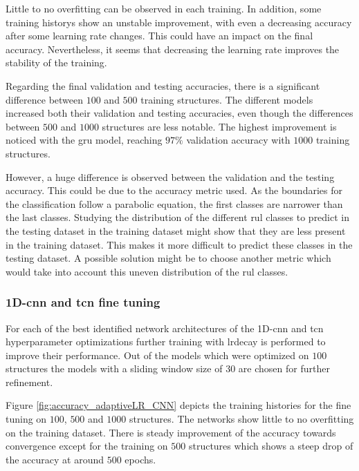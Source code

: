 \documentclass[conference]{IEEEtran}
\begin{document}
Little to no overfitting can be observed in each training. In addition, some training historys show an unstable improvement, with even a decreasing accuracy after some learning rate changes. This could have an impact on the final accuracy. Nevertheless, it seems that decreasing the learning rate improves the stability of the training.

Regarding the final validation and testing accuracies, there is a significant difference between $ 100 $ and $ 500 $ training structures. The different models increased both their validation and testing accuracies, even though the differences between $ 500 $ and $ 1000 $ structures are less notable. The highest improvement is noticed with the \gls{gru} model, reaching $ 97 \% $ validation accuracy with $ 1000 $ training structures.

However, a huge difference is observed between the validation and the testing accuracy. This could be due to the accuracy metric used. As the boundaries for the classification follow a parabolic equation, the first classes are narrower than the last classes. Studying the distribution of the different \gls{rul} classes to predict in the testing dataset in the training dataset might show that they are less present in the training dataset. This makes it more difficult to predict these classes in the testing dataset. A possible solution might be to choose another metric which would take into account this uneven distribution of the \gls{rul} classes.

\subsubsection{1D-\gls{cnn} and \gls{tcn} fine tuning}
\label{sec:cnn_fine_tuning_results}

For each of the best identified network architectures of the 1D-\gls{cnn} and \gls{tcn} hyperparameter optimizations further training with \gls{lrdecay} is performed to improve their performance. Out of the models which were optimized on $ 100 $ structures the models with a sliding window size of $ 30 $ are chosen for further refinement.

Figure \ref{fig:accuracy_adaptiveLR_CNN} depicts the training histories for the fine tuning on $ 100 $, $ 500 $ and $ 1000 $ structures. The networks show little to no overfitting on the training dataset. There is steady improvement of the accuracy towards convergence except for the training on $ 500 $ structures which shows a steep drop of the accuracy at around $ 500 $ epochs.
\end{document}
